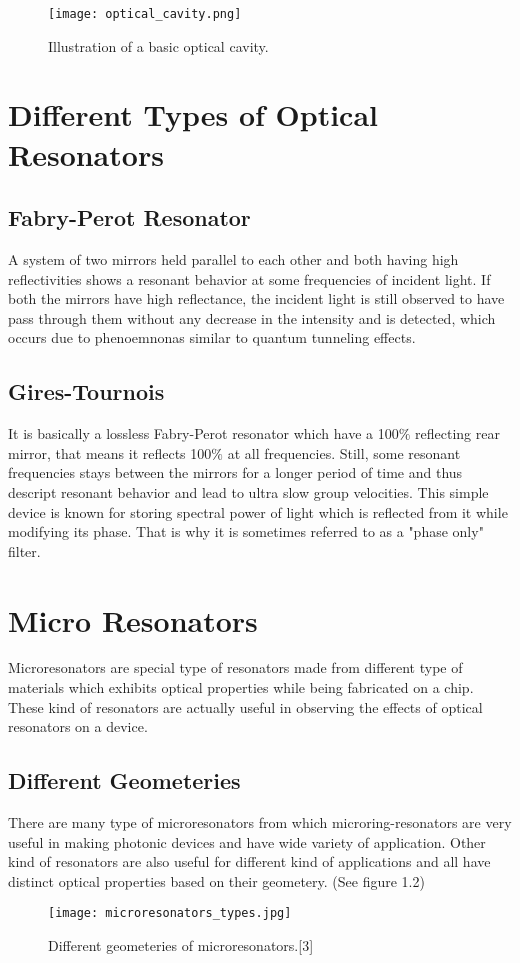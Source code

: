 \begin{figure}[h]
\centering
\texttt{[image: optical\_cavity.png]}
\caption{Illustration of a basic optical cavity.}
\end{figure}

\newpage
\section{Different Types of Optical Resonators}
\subsection{Fabry-Perot Resonator}
A system of two mirrors held parallel to each other and both having high reflectivities shows a resonant behavior at some frequencies of incident light. If both the mirrors have high reflectance, the incident light is still observed to have pass through them without any decrease in the intensity and is detected, which occurs due to phenoemnonas similar to quantum tunneling effects.

\subsection{Gires-Tournois}
It is basically a lossless Fabry-Perot resonator which have a 100$\%$ reflecting rear mirror, that means it reflects 100$\%$ at all frequencies. Still, some resonant frequencies stays between the mirrors for a longer period of time and thus descript resonant behavior and lead to ultra slow group velocities. This simple device is known for storing spectral power of light which is reflected from it while modifying its phase. That is why it is sometimes referred to as a "phase only" filter.


\section{Micro Resonators}
Microresonators are special type of resonators made from different type of materials which exhibits optical properties while being fabricated on a chip. These kind of resonators are actually useful in observing the effects of optical resonators on a device.
\subsection{Different Geometeries}
There are many type of microresonators from which microring-resonators are very useful in making photonic devices and have wide variety of application. Other kind of resonators are also useful for different kind of applications and all have distinct optical properties based on their geometery. (See figure 1.2)
\begin{figure}[h]
\centering
\texttt{[image: microresonators\_types.jpg]}
\caption{Different geometeries of microresonators.[3]}
\end{figure}


